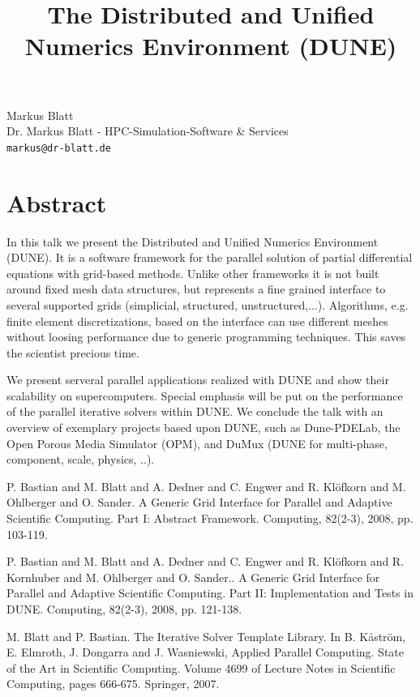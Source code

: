 \documentclass[article, A4, 11pt]{llncs}%
\begin{document}
\title{The Distributed and Unified Numerics Environment (DUNE)}
 \author{} \institute{}
\maketitle
\begin{center}
{\large Markus Blatt}\\
Dr. Markus Blatt - HPC-Simulation-Software \& Services\\
{\tt markus@dr-blatt.de}
\end{center}

\section*{Abstract}
In this talk we present the Distributed and Unified Numerics Environment (DUNE). It is a software framework for the parallel solution of partial differential equations with grid-based methods. Unlike other frameworks it is not built around fixed mesh data structures, but represents a fine grained interface to several supported grids (simplicial, structured, unstructured,...). Algorithms, e.g. finite element discretizations, based on the interface can use different meshes without loosing performance due to generic programming techniques. This saves the scientist precious time.  

We present serveral parallel applications realized with DUNE and show their scalability on supercomputers. Special emphasis will be put on the performance of the parallel iterative solvers within DUNE. We conclude the talk with an overview of exemplary projects based upon DUNE, such as Dune-PDELab, the Open Porous Media Simulator  (OPM), and DuMux (DUNE for multi-phase, component, scale, physics, ..).


\begin{thebibliography}{10}
{\sc P. Bastian and M. Blatt and A. Dedner and C. Engwer and R. Klöfkorn and M. Ohlberger and O. Sander}. {A Generic Grid Interface for Parallel and Adaptive Scientific Computing. Part I: Abstract Framework}. Computing, 82(2-3), 2008, pp. 103-119.

{\sc P. Bastian and M. Blatt and A. Dedner and C. Engwer and R. Klöfkorn and R. Kornhuber and M. Ohlberger and O. Sander.}. {A Generic Grid Interface for Parallel and Adaptive Scientific Computing. Part II: Implementation and Tests in DUNE}. Computing, 82(2-3), 2008, pp. 121-138.

{\sc M. Blatt and P. Bastian}. {The Iterative Solver Template Library}. In B. Kåström, E. Elmroth, J. Dongarra and J. Wasniewski, Applied Parallel Computing. State of the Art in Scientific Computing. Volume 4699 of Lecture Notes in Scientific Computing, pages 666-675. Springer, 2007.
\end{thebibliography} %
\end{document}
